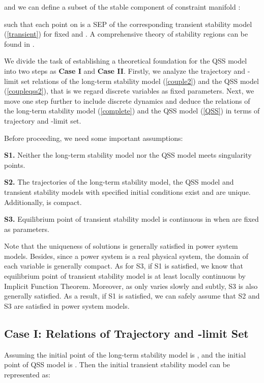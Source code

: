 \documentclass[journal]{IEEEtran}
\begin{document}
and we can define a subset of the stable component of constraint manifold :


such that each point on  is a SEP of the corresponding transient stability model (\ref{transient}) for fixed  and . A comprehensive theory of stability regions can be found in \cite{Alberto:article}\cite{Chiang:article1988}\cite{Chiang:article1989}.

We divide the task of establishing a theoretical foundation for the QSS model into two steps as \textbf{Case I} and \textbf{Case II}. Firstly, we analyze the trajectory and -limit set relations of the long-term stability model (\ref{couple2}) and the QSS model (\ref{coupleqss2}), that is we regard discrete variables  as fixed parameters. Next, we move one step further to include discrete dynamics  and deduce the relations of the long-term stability model (\ref{complete}) and the QSS model (\ref{QSS}) in terms of trajectory and -limit set.

Before proceeding, we need some important assumptions:

\noindent\textbf{S1.} Neither the long-term stability model nor the QSS model meets singularity points.

\noindent\textbf{S2.} The trajectories of the long-term stability model, the QSS model and transient stability models with specified initial conditions exist and are unique. Additionally,  is compact.

\noindent\textbf{S3.} Equilibrium point of transient stability model is continuous in  when  are fixed as parameters.

Note that the uniqueness of solutions is generally satisfied in power system models. Besides, since a power system is a real physical system, the domain of each variable is generally compact. As for S3, if S1 is satisfied, we know that equilibrium point of transient stability model  is at least locally continuous by Implicit Function Theorem. Moreover, as  only varies slowly and subtly, S3 is also generally satisfied. As a result, if S1 is satisfied, we can safely assume that S2 and S3 are satisfied in power system models.

\subsection{Case I: Relations of Trajectory and -limit Set}

Assuming the initial point of the long-term stability model is , and the initial point of QSS model is . Then the initial transient stability model can be represented as:
\end{document}
